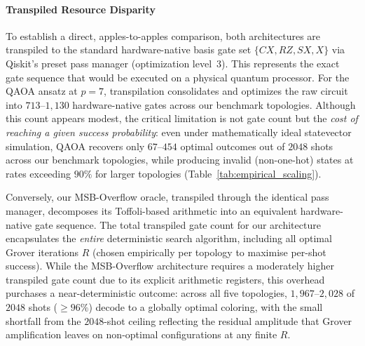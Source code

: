 \documentclass{ieeeaccess}
\begin{document}
\paragraph{Transpiled Resource Disparity}
To establish a direct, apples-to-apples comparison, both architectures are transpiled to the standard hardware-native basis gate set $\{CX, RZ, SX, X\}$ via Qiskit's preset pass manager (optimization level~3). This represents the exact gate sequence that would be executed on a physical quantum processor. For the QAOA ansatz at $p=7$, transpilation consolidates and optimizes the raw circuit into $713$--$1{,}130$ hardware-native gates across our benchmark topologies. Although this count appears modest, the critical limitation is not gate count but the \textit{cost of reaching a given success probability}: even under mathematically ideal statevector simulation, QAOA recovers only $67$--$454$ optimal outcomes out of $2048$ shots across our benchmark topologies, while producing invalid (non-one-hot) states at rates exceeding $90\%$ for larger topologies (Table~\ref{tab:empirical_scaling}).

Conversely, our MSB-Overflow oracle, transpiled through the identical pass manager, decomposes its Toffoli-based arithmetic into an equivalent hardware-native gate sequence. The total transpiled gate count for our architecture encapsulates the \textit{entire} deterministic search algorithm, including all optimal Grover iterations $R$ (chosen empirically per topology to maximise per-shot success). While the MSB-Overflow architecture requires a moderately higher transpiled gate count due to its explicit arithmetic registers, this overhead purchases a near-deterministic outcome: across all five topologies, $1{,}967$--$2{,}028$ of $2048$ shots ($\ge 96\%$) decode to a globally optimal coloring, with the small shortfall from the $2048$-shot ceiling reflecting the residual amplitude that Grover amplification leaves on non-optimal configurations at any finite $R$.
\end{document}
